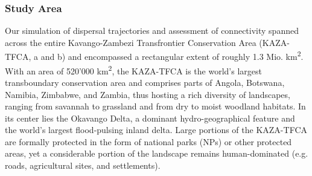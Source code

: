 \documentclass[abstract=on,10pt,a4paper,bibliography=totocnumbered]{article}
\begin{document}
\subsubsection{Study Area}
Our simulation of dispersal trajectories and assessment of connectivity spanned
across the entire Kavango-Zambezi Transfrontier Conservation Area (KAZA-TFCA,
a and b) and encompassed a rectangular extent of roughly 1.3
Mio. km\textsuperscript{2}. With an area of 520'000 km\textsuperscript{2}, the
KAZA-TFCA is the world's largest transboundary conservation area and comprises
parts of Angola, Botswana, Namibia, Zimbabwe, and Zambia, thus hosting a rich
diversity of landscapes, ranging from savannah to grassland and from dry to
moist woodland habitats. In its center lies the Okavango Delta, a dominant
hydro-geographical feature and the world's largest flood-pulsing inland delta.
Large portions of the KAZA-TFCA are formally protected in the form of national
parks (NPs) or other protected areas, yet a considerable portion of the
landscape remains human-dominated (e.g. roads, agricultural sites, and
settlements).
\end{document}
